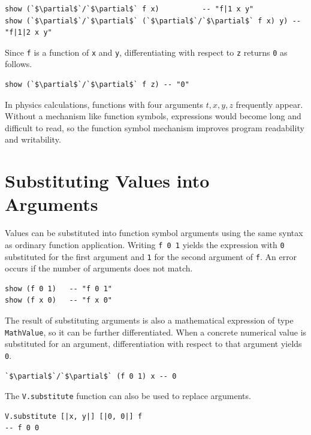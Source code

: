 \begin{lstlisting}[language=egison,numbers=none]
show (`$\partial$`/`$\partial$` f x)          -- "f|1 x y"
show (`$\partial$`/`$\partial$` (`$\partial$`/`$\partial$` f x) y) -- "f|1|2 x y"
\end{lstlisting}

Since \lstinline{f} is a function of \lstinline{x} and \lstinline{y}, differentiating with respect to \lstinline{z} returns \lstinline{0} as follows.

\begin{lstlisting}[language=egison,numbers=none]
show (`$\partial$`/`$\partial$` f z) -- "0"
\end{lstlisting}

In physics calculations, functions with four arguments $t,x,y,z$ frequently appear.
Without a mechanism like function symbols, expressions would become long and difficult to read, so the function symbol mechanism improves program readability and writability.

\section{Substituting Values into Arguments}\label{funcsym-apply}

Values can be substituted into function symbol arguments using the same syntax as ordinary function application.
Writing \lstinline{f 0 1} yields the expression with \lstinline{0} substituted for the first argument and \lstinline{1} for the second argument of \lstinline{f}.
An error occurs if the number of arguments does not match.

\begin{lstlisting}[language=egison,numbers=none]
show (f 0 1)   -- "f 0 1"
show (f x 0)   -- "f x 0"
\end{lstlisting}

The result of substituting arguments is also a mathematical expression of type \lstinline{MathValue}, so it can be further differentiated.
When a concrete numerical value is substituted for an argument, differentiation with respect to that argument yields \lstinline{0}.

\begin{lstlisting}[language=egison,numbers=none]
`$\partial$`/`$\partial$` (f 0 1) x -- 0
\end{lstlisting}

The \lstinline{V.substitute} function can also be used to replace arguments.

\begin{lstlisting}[language=egison,numbers=none]
V.substitute [|x, y|] [|0, 0|] f
-- f 0 0
\end{lstlisting}


